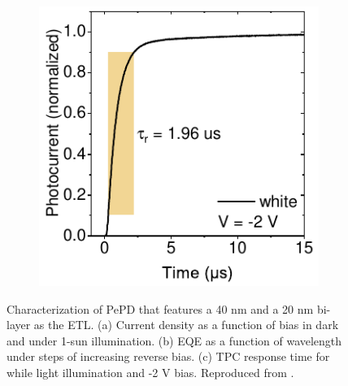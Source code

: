 \begin{figure}[htbp]
\begin{subfigure}{0.32\textwidth}
        \caption{}
        \label{}
    \end{subfigure}
    \hfill
    \begin{subfigure}{0.3\textwidth}
        \centering
        \includegraphics[width=\textwidth]{chapters/transport_layers/images/40C60-20TiO2-rise.pdf}
        \caption{}
    \end{subfigure}
    
    \caption[Overview of electrical characterization for a PePD that features a 40 nm  and a 20 nm  bi-layer as the ETL.]{Characterization of PePD that features a 40 nm  and a 20 nm  bi-layer as the ETL. (a) Current density as a function of bias in dark and under 1-sun illumination. (b) EQE as a function of wavelength under steps of increasing reverse bias. (c) TPC response time for while light illumination and -2 V bias. Reproduced from \cite{Papadopoulou2025ElectronSpeed}.}
    \label{fig:etl_opt:40C60_20TiO2}
\end{figure}




